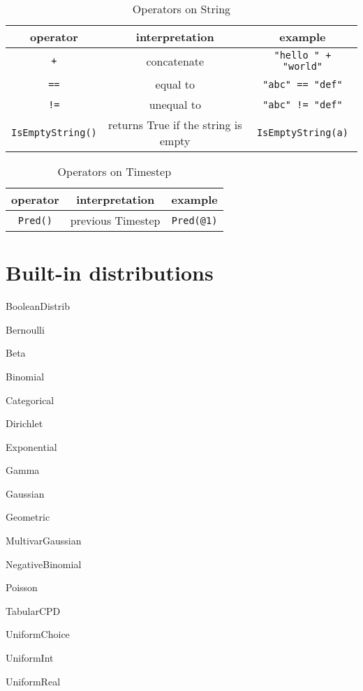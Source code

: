 \documentclass[12pt]{article}
\begin{document}
\begin{table}[H]
\centering
\caption{Operators on String}
\begin{tabular}{ c c c }
\toprule 
operator & interpretation & example \\
\midrule
{\tt +} & concatenate & \verb|"hello " + "world"|  \\ 
{\tt ==} & equal to & \verb|"abc" == "def"|  \\
{\tt !=} & unequal to & \verb|"abc" != "def"|\\ 
\verb|IsEmptyString()| & returns True if the string is empty & \verb|IsEmptyString(a)| \\
\bottomrule
\end{tabular}
\end{table}

\begin{table}[H]
\centering
\caption{Operators on Timestep}
\begin{tabular}{ c c c }
\toprule 
operator & interpretation & example \\
\midrule
\verb|Pred()| & previous Timestep & \verb|Pred(@1)|  \\
\bottomrule
\end{tabular}
\end{table}

\section{Built-in distributions}
\begin{itemize*}
\item BooleanDistrib
\item Bernoulli
\item Beta
\item Binomial
\item Categorical
\item Dirichlet
\item Exponential
\item Gamma
\item Gaussian
\item Geometric
\item MultivarGaussian
\item NegativeBinomial
\item Poisson
\item TabularCPD
\item UniformChoice
\item UniformInt
\item UniformReal
\end{itemize*}
\end{document}
